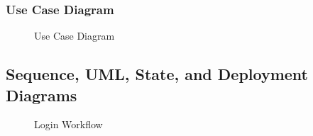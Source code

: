 \documentclass[a4paper, 12pt]{report} %
\begin{document}
        \pagebreak
        \subsubsection{Use Case Diagram}

            \begin{figure}[H]
                \centering
                \caption{Use Case Diagram}
                \label{fig:usecase}
            \end{figure}

    \pagebreak
    \subsection{Sequence, UML, State, and Deployment Diagrams}

        \begin{figure}[H]
            \centering
            \caption{Login Workflow}
            \label{fig:seq_dig_login}
        \end{figure}
\end{document}
